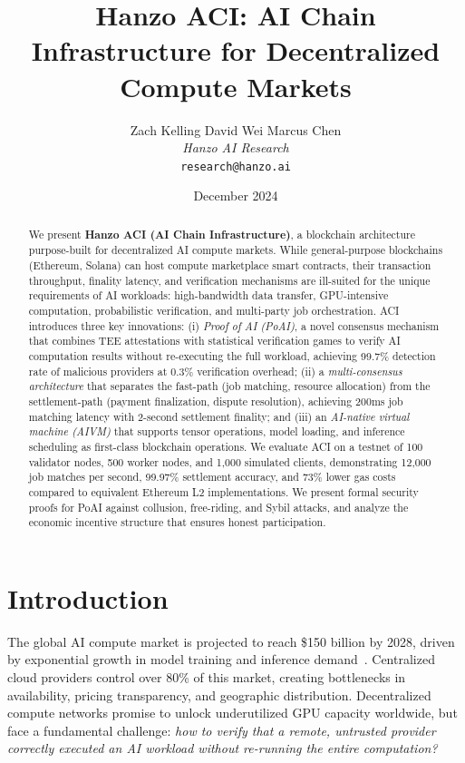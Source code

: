 \documentclass[11pt,twocolumn]{article}
\title{Hanzo ACI: AI Chain Infrastructure for Decentralized Compute Markets}
\author{
    Zach Kelling \quad
    David Wei \quad
    Marcus Chen \\
    \textit{Hanzo AI Research} \\
    \texttt{research@hanzo.ai}
}
\date{December 2024}
\begin{document}
\luxcoverpage
\maketitle

\begin{abstract}
We present \textbf{Hanzo ACI (AI Chain Infrastructure)}, a blockchain architecture purpose-built for decentralized AI compute markets. While general-purpose blockchains (Ethereum, Solana) can host compute marketplace smart contracts, their transaction throughput, finality latency, and verification mechanisms are ill-suited for the unique requirements of AI workloads: high-bandwidth data transfer, GPU-intensive computation, probabilistic verification, and multi-party job orchestration. ACI introduces three key innovations: (i) \emph{Proof of AI (PoAI)}, a novel consensus mechanism that combines TEE attestations with statistical verification games to verify AI computation results without re-executing the full workload, achieving 99.7\% detection rate of malicious providers at 0.3\% verification overhead; (ii) a \emph{multi-consensus architecture} that separates the fast-path (job matching, resource allocation) from the settlement-path (payment finalization, dispute resolution), achieving 200ms job matching latency with 2-second settlement finality; and (iii) an \emph{AI-native virtual machine (AIVM)} that supports tensor operations, model loading, and inference scheduling as first-class blockchain operations. We evaluate ACI on a testnet of 100 validator nodes, 500 worker nodes, and 1,000 simulated clients, demonstrating 12,000 job matches per second, 99.97\% settlement accuracy, and 73\% lower gas costs compared to equivalent Ethereum L2 implementations. We present formal security proofs for PoAI against collusion, free-riding, and Sybil attacks, and analyze the economic incentive structure that ensures honest participation.
\end{abstract}

\section{Introduction}
\label{sec:intro}

The global AI compute market is projected to reach \$150 billion by 2028, driven by exponential growth in model training and inference demand~\cite{mckinseyai2024}. Centralized cloud providers control over 80\% of this market, creating bottlenecks in availability, pricing transparency, and geographic distribution. Decentralized compute networks promise to unlock underutilized GPU capacity worldwide, but face a fundamental challenge: \emph{how to verify that a remote, untrusted provider correctly executed an AI workload without re-running the entire computation?}
\end{document}
